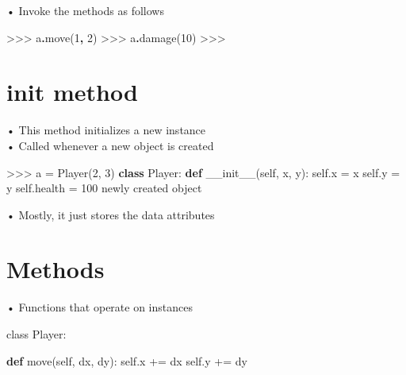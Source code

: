 \documentclass[
  letterpaper,
  DIV=11,
  numbers=noendperiod]{scrreprt}
\newenvironment{Shaded}{\begin{snugshade}}{\end{snugshade}}
\newcommand{\BuiltInTok}[1]{\textcolor[rgb]{0.00,0.23,0.31}{#1}}
\newcommand{\DecValTok}[1]{\textcolor[rgb]{0.68,0.00,0.00}{#1}}
\newcommand{\FunctionTok}[1]{\textcolor[rgb]{0.28,0.35,0.67}{#1}}
\newcommand{\KeywordTok}[1]{\textcolor[rgb]{0.00,0.23,0.31}{\textbf{#1}}}
\newcommand{\NormalTok}[1]{\textcolor[rgb]{0.00,0.23,0.31}{#1}}
\newcommand{\OperatorTok}[1]{\textcolor[rgb]{0.37,0.37,0.37}{#1}}
\newcommand{\VariableTok}[1]{\textcolor[rgb]{0.07,0.07,0.07}{#1}}
\begin{document}
• Invoke the methods as follows

\begin{Shaded}
\begin{Highlighting}[]
\NormalTok{\textgreater{}\textgreater{}\textgreater{} a}\KeywordTok{.}\NormalTok{move(}\DecValTok{1}\KeywordTok{,} \DecValTok{2}\NormalTok{)  }
\NormalTok{\textgreater{}\textgreater{}\textgreater{} a}\KeywordTok{.}\NormalTok{damage(}\DecValTok{10}\NormalTok{)  }
\NormalTok{\textgreater{}\textgreater{}\textgreater{} }
\end{Highlighting}
\end{Shaded}


\chapter{init method}\label{init-method}

• This method initializes a new instance\\
• Called whenever a new object is created

\begin{Shaded}
\begin{Highlighting}[]
\OperatorTok{\textgreater{}\textgreater{}\textgreater{}}\NormalTok{ a }\OperatorTok{=}\NormalTok{ Player(}\DecValTok{2}\NormalTok{, }\DecValTok{3}\NormalTok{)  }
\KeywordTok{class}\NormalTok{ Player:  }
    \KeywordTok{def} \FunctionTok{\_\_init\_\_}\NormalTok{(}\VariableTok{self}\NormalTok{, x, y):  }
        \VariableTok{self}\NormalTok{.x }\OperatorTok{=}\NormalTok{ x  }
        \VariableTok{self}\NormalTok{.y }\OperatorTok{=}\NormalTok{ y  }
        \VariableTok{self}\NormalTok{.health }\OperatorTok{=} \DecValTok{100}  
\NormalTok{        newly created }\BuiltInTok{object} 
\end{Highlighting}
\end{Shaded}

• Mostly, it just stores the data attributes


\chapter{Methods}\label{methods}

• Functions that operate on instances

class Player:

\begin{Shaded}
\begin{Highlighting}[]
\KeywordTok{def}\NormalTok{ move(}\VariableTok{self}\NormalTok{, dx, dy): }\VariableTok{self}\NormalTok{.x }\OperatorTok{+=}\NormalTok{ dx }\VariableTok{self}\NormalTok{.y }\OperatorTok{+=}\NormalTok{ dy }
\end{Highlighting}
\end{Shaded}
\end{document}
